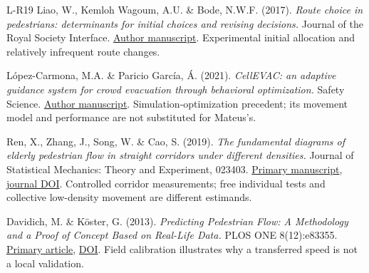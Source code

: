 \documentclass[11pt,a4paper]{article}
\begin{document}
\begin{thebibliography}{L-R19}
 Liao, W., Kemloh Wagoum, A.U. \& Bode, N.W.F. (2017). \emph{Route choice in pedestrians: determinants for initial choices and revising decisions.} Journal of the Royal Society Interface. \href{https://research-information.bris.ac.uk/files/104660277/Nikolai_Bode_Route_choice_in_pedestrians_determinants_for_initial_choices_and_revising.pdf}{Author manuscript}. Experimental initial allocation and relatively infrequent route changes.

 López-Carmona, M.A. \& Paricio García, Á. (2021). \emph{CellEVAC: an adaptive guidance system for crowd evacuation through behavioral optimization.} Safety Science. \href{https://arxiv.org/abs/2007.05963}{Author manuscript}. Simulation-optimization precedent; its movement model and performance are not substituted for Mateus's.

 Ren, X., Zhang, J., Song, W. \& Cao, S. (2019). \emph{The fundamental diagrams of elderly pedestrian flow in straight corridors under different densities.} Journal of Statistical Mechanics: Theory and Experiment, 023403. \href{https://arxiv.org/abs/1811.10883}{Primary manuscript}, \href{https://doi.org/10.1088/1742-5468/aafa7b}{journal DOI}. Controlled corridor measurements; free individual tests and collective low-density movement are different estimands.

 Davidich, M. \& Köster, G. (2013). \emph{Predicting Pedestrian Flow: A Methodology and a Proof of Concept Based on Real-Life Data.} PLOS ONE 8(12):e83355. \href{https://pmc.ncbi.nlm.nih.gov/articles/PMC3873946/}{Primary article}, \href{https://doi.org/10.1371/journal.pone.0083355}{DOI}. Field calibration illustrates why a transferred speed is not a local validation.
\end{thebibliography}
\end{document}
